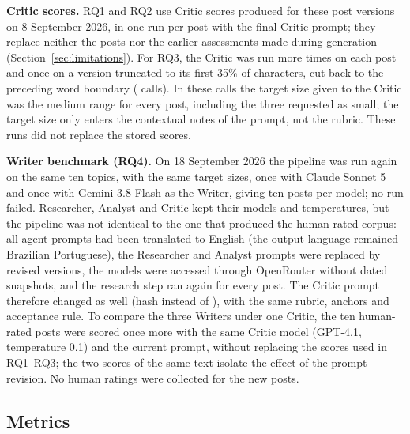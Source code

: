 \documentclass[a4paper,twoside]{article}
\begin{document}
\textbf{Critic scores.} RQ1 and RQ2 use Critic scores produced for these post versions on 8 September 2026, in one run per post with the final Critic prompt; they replace neither the posts nor the earlier assessments made during generation (Section~\ref{sec:limitations}). For RQ3, the Critic was run \RepRuns{} more times on each post and once on a version truncated to its first 35\% of characters, cut back to the preceding word boundary (\RepCalls{} calls). In these calls the target size given to the Critic was the medium range for every post, including the three requested as small; the target size only enters the contextual notes of the prompt, not the rubric. These runs did not replace the stored scores.

\textbf{Writer benchmark (RQ4).} On 18 September 2026 the pipeline was run again on the same ten topics, with the same target sizes, once with Claude Sonnet 5 and once with Gemini 3.8 Flash as the Writer, giving ten posts per model; no run failed. Researcher, Analyst and Critic kept their models and temperatures, but the pipeline was not identical to the one that produced the human-rated corpus: all agent prompts had been translated to English (the output language remained Brazilian Portuguese), the Researcher and Analyst prompts were replaced by revised versions, the models were accessed through OpenRouter without dated snapshots, and the research step ran again for every post. The Critic prompt therefore changed as well (hash \BmNewHash{} instead of \BmOldHash{}), with the same rubric, anchors and acceptance rule. To compare the three Writers under one Critic, the ten human-rated posts were scored once more with the same Critic model (GPT-4.1, temperature 0.1) and the current prompt, without replacing the scores used in RQ1--RQ3; the two scores of the same text isolate the effect of the prompt revision. No human ratings were collected for the new posts.

\subsection{Metrics}
\label{sec:metrics}
\end{document}

